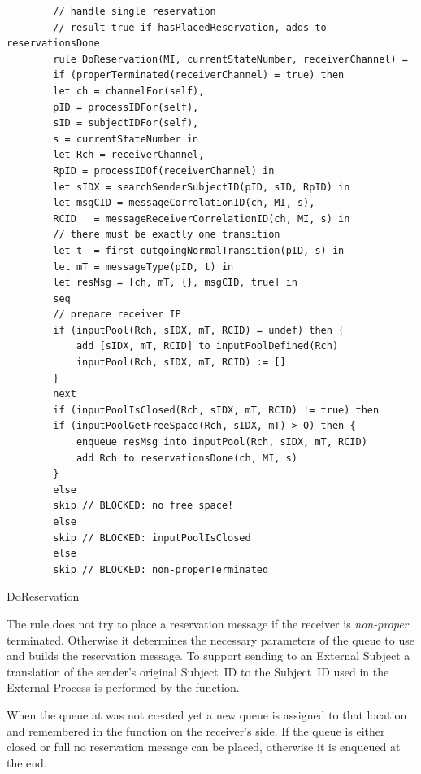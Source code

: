 \begin{listing}[H]
	\begin{verbatim}
		// handle single reservation
		// result true if hasPlacedReservation, adds to reservationsDone
		rule DoReservation(MI, currentStateNumber, receiverChannel) =
		if (properTerminated(receiverChannel) = true) then
		let ch = channelFor(self),
		pID = processIDFor(self),
		sID = subjectIDFor(self),
		s = currentStateNumber in
		let Rch = receiverChannel,
		RpID = processIDOf(receiverChannel) in
		let sIDX = searchSenderSubjectID(pID, sID, RpID) in
		let msgCID = messageCorrelationID(ch, MI, s),
		RCID   = messageReceiverCorrelationID(ch, MI, s) in
		// there must be exactly one transition
		let t  = first_outgoingNormalTransition(pID, s) in
		let mT = messageType(pID, t) in
		let resMsg = [ch, mT, {}, msgCID, true] in
		seq
		// prepare receiver IP
		if (inputPool(Rch, sIDX, mT, RCID) = undef) then {
			add [sIDX, mT, RCID] to inputPoolDefined(Rch)
			inputPool(Rch, sIDX, mT, RCID) := []
		}
		next
		if (inputPoolIsClosed(Rch, sIDX, mT, RCID) != true) then
		if (inputPoolGetFreeSpace(Rch, sIDX, mT) > 0) then {
			enqueue resMsg into inputPool(Rch, sIDX, mT, RCID)
			add Rch to reservationsDone(ch, MI, s)
		}
		else
		skip // BLOCKED: no free space!
		else
		skip // BLOCKED: inputPoolIsClosed
		else
		skip // BLOCKED: non-properTerminated
	\end{verbatim}
	\caption{DoReservation}
	\label{lst:shortasm:DoReservation}
\end{listing}

The  rule does not try to place a reservation message
if the receiver is \textit{non-proper} terminated. Otherwise it determines
the necessary parameters of the queue to use and builds the reservation message.
To support sending to an External Subject a translation of the sender's original
Subject~ID to the Subject~ID used in the External Process is performed by the
 function.

When the queue at  was not
created yet a new queue is assigned to that location and remembered in the
 function on the receiver's side.
If the queue is either closed or full no reservation message can be placed,
otherwise it is enqueued at the end.

